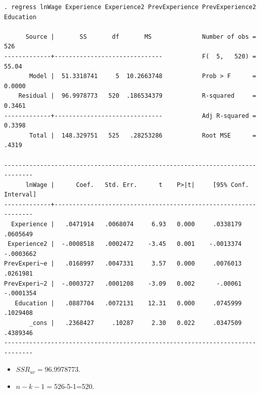 \documentclass[notes=show,compress,beamer]{beamer}
\begin{document}
\begin{frame}[fragile=singleslide,shrink=30]%

\begin{verbatim}
. regress lnWage Experience Experience2 PrevExperience PrevExperience2 Education
 
      Source |       SS       df       MS              Number of obs =     526
-------------+------------------------------           F(  5,   520) =   55.04
       Model |  51.3318741     5  10.2663748           Prob > F      =  0.0000
    Residual |  96.9978773   520  .186534379           R-squared     =  0.3461
-------------+------------------------------           Adj R-squared =  0.3398
       Total |  148.329751   525   .28253286           Root MSE      =   .4319
 
------------------------------------------------------------------------------
      lnWage |      Coef.   Std. Err.      t    P>|t|     [95% Conf. Interval]
-------------+----------------------------------------------------------------
  Experience |   .0471914   .0068074     6.93   0.000     .0338179    .0605649
 Experience2 |  -.0008518   .0002472    -3.45   0.001    -.0013374   -.0003662
PrevExperi~e |   .0168997   .0047331     3.57   0.000     .0076013    .0261981
PrevExperi~2 |  -.0003727   .0001208    -3.09   0.002      -.00061   -.0001354
   Education |   .0887704   .0072131    12.31   0.000     .0745999    .1029408
       _cons |   .2368427     .10287     2.30   0.022     .0347509    .4389346
------------------------------------------------------------------------------
\end{verbatim}

\begin{itemize}
\item $SSR_{ur}=$96.9978773.

\item $n-k-1=$526-5-1=520.
\end{itemize}

\end{frame}%
\end{document}
